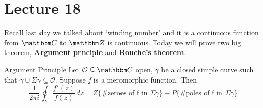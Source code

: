 \documentclass[../ComplexAnalysis_Notes.tex]{subfiles}
\begin{document}
\chapter*{Lecture 18} %
\setcounter{chapter}{18} %
\setcounter{section}{0}
\setcounter{equation}{0}
\setcounter{figure}{0}
Recall last day we talked about `winding number' and it is a continuous function from $\C$ to $\Z$ is continuous. Today we will prove two big theorem, \textbf{Argument prnciple} and \textbf{Rouche's theorem}.  

\begin{Thm}{Argument Principle}{}
    Let $\mathcal{O}\subseteq \C$ open, $\gamma$ be a closed simple curve such that $\gamma \cup \Sigma \gamma \subseteq \mathcal{O}$. Suppose $f$ is a meromorphic function. Then $$\frac{1}{2\pi i}\oint_{\gamma}\frac{f'(z)}{f(z)}\, dz = Z \{\text{\# zeroes of f in }\Sigma\gamma\}-P \{\text{\# poles  of f in }\Sigma\gamma\}$$
\end{Thm}

\end{document}
